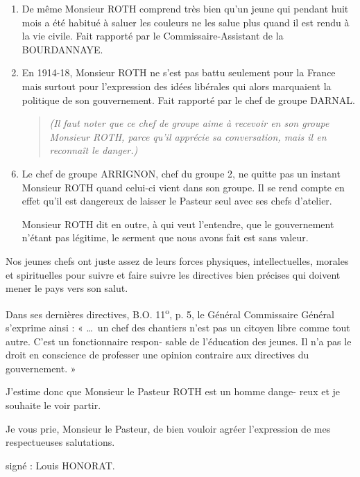 {\begin{enumerate}
\item
De même Monsieur ROTH comprend très bien qu’un jeune
qui pendant huit mois a été habitué à saluer les couleurs ne les salue
plus quand il est rendu à la vie civile. Fait rapporté par le Commissaire-Assistant de la BOURDANNAYE.

\item
En 1914-18, Monsieur ROTH ne s’est pas battu seulement
pour la France mais surtout pour l’expression des idées libérales qui
alors marquaient la politique de son gouvernement. Fait rapporté par
le chef de groupe DARNAL.

\begin{quote}
\emph{(Il faut noter que ce chef de groupe aime à recevoir en son
groupe Monsieur ROTH, parce qu’il apprécie sa conversation, mais il
en reconnaît le danger.)
}
\end{quote}
\end{enumerate}


\newpage
\papierquadrille
\thispagestyle{empty}

\begin{enumerate}
\setcounter{enumi}{5}

\item
Le chef de groupe ARRIGNON, chef du groupe 2, ne quitte
pas un instant Monsieur ROTH quand celui-ci vient dans son groupe.
Il se rend compte en effet qu’il est dangereux de laisser le Pasteur seul
avec ses chefs d’atelier.

Monsieur ROTH dit en outre, à qui veut l’entendre, que le
gouvernement n’étant pas légitime, le serment que nous avons fait est
sans valeur.

\end{enumerate}

Nos jeunes chefs ont juste assez de leurs forces physiques,
intellectuelles, morales et spirituelles pour suivre et faire suivre
les directives bien précises qui doivent mener le pays vers son salut.

Dans ses dernières directives, B.O. 11\textsuperscript{o}, p. 5, le Général
Commissaire Général s’exprime ainsi : « \ldots\ un chef des chantiers n’est
pas un citoyen libre comme tout autre. C’est un fonctionnaire respon-
sable de l’éducation des jeunes. Il n’a pas le droit en conscience de
professer une opinion contraire aux directives du gouvernement. »

J’estime donc que Monsieur le Pasteur ROTH est un homme dange-
reux et je souhaite le voir partir.

Je vous prie, Monsieur le Pasteur, de bien vouloir agréer
l’expression de mes respectueuses salutations.

\begin{flushright}
signé : Louis HONORAT.
\end{flushright}
}

